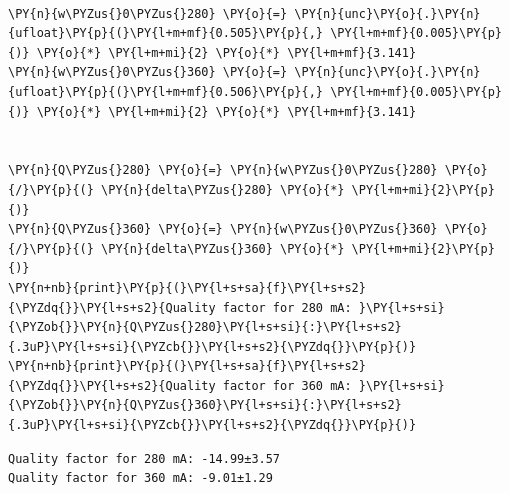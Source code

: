     \begin{center}
    \end{center}
    { \hspace*{\fill} \\}
    
    \begin{tcolorbox}[breakable, size=fbox, boxrule=1pt, pad at break*=1mm,colback=cellbackground, colframe=cellborder]
\begin{Verbatim}[commandchars=\\\{\}]
\PY{n}{w\PYZus{}0\PYZus{}280} \PY{o}{=} \PY{n}{unc}\PY{o}{.}\PY{n}{ufloat}\PY{p}{(}\PY{l+m+mf}{0.505}\PY{p}{,} \PY{l+m+mf}{0.005}\PY{p}{)} \PY{o}{*} \PY{l+m+mi}{2} \PY{o}{*} \PY{l+m+mf}{3.141}
\PY{n}{w\PYZus{}0\PYZus{}360} \PY{o}{=} \PY{n}{unc}\PY{o}{.}\PY{n}{ufloat}\PY{p}{(}\PY{l+m+mf}{0.506}\PY{p}{,} \PY{l+m+mf}{0.005}\PY{p}{)} \PY{o}{*} \PY{l+m+mi}{2} \PY{o}{*} \PY{l+m+mf}{3.141}


\PY{n}{Q\PYZus{}280} \PY{o}{=} \PY{n}{w\PYZus{}0\PYZus{}280} \PY{o}{/}\PY{p}{(} \PY{n}{delta\PYZus{}280} \PY{o}{*} \PY{l+m+mi}{2}\PY{p}{)}
\PY{n}{Q\PYZus{}360} \PY{o}{=} \PY{n}{w\PYZus{}0\PYZus{}360} \PY{o}{/}\PY{p}{(} \PY{n}{delta\PYZus{}360} \PY{o}{*} \PY{l+m+mi}{2}\PY{p}{)}
\PY{n+nb}{print}\PY{p}{(}\PY{l+s+sa}{f}\PY{l+s+s2}{\PYZdq{}}\PY{l+s+s2}{Quality factor for 280 mA: }\PY{l+s+si}{\PYZob{}}\PY{n}{Q\PYZus{}280}\PY{l+s+si}{:}\PY{l+s+s2}{.3uP}\PY{l+s+si}{\PYZcb{}}\PY{l+s+s2}{\PYZdq{}}\PY{p}{)}
\PY{n+nb}{print}\PY{p}{(}\PY{l+s+sa}{f}\PY{l+s+s2}{\PYZdq{}}\PY{l+s+s2}{Quality factor for 360 mA: }\PY{l+s+si}{\PYZob{}}\PY{n}{Q\PYZus{}360}\PY{l+s+si}{:}\PY{l+s+s2}{.3uP}\PY{l+s+si}{\PYZcb{}}\PY{l+s+s2}{\PYZdq{}}\PY{p}{)}
\end{Verbatim}
\end{tcolorbox}

    \begin{Verbatim}[commandchars=\\\{\}]
Quality factor for 280 mA: -14.99±3.57
Quality factor for 360 mA: -9.01±1.29
    \end{Verbatim}

